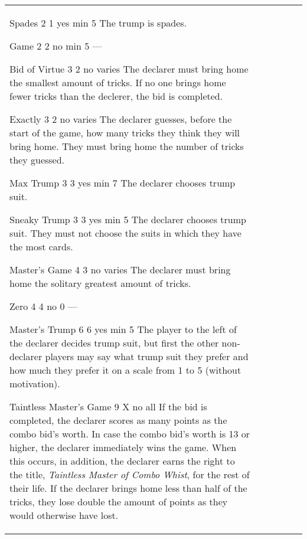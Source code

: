 \begin{table}
\begin{center}
\begin{tabularx}{\textwidth}{
			l
			S[table-number-alignment=center, table-format=1.0]
			S[table-number-alignment=center, table-format=1.0]
			cc|X
		}
				\standardBidItem%
				{Spades}
				{2}
				{1}
				{yes}
				{min 5}
				{%
					The trump is spades.
				}

				\standardBidItem%
				{Game}
				{2}
				{2}
				{no}
				{min 5}
				{%
					---
				}

				\standardBidItem%
				{Bid of Virtue}
				{3}
				{2}
				{no}
				{varies}
				{%
					The declarer must bring home the smallest amount of tricks. If no one brings home fewer tricks than the declerer, the bid is completed.
				}

				\standardBidItem%
				{Exactly}
				{3}
				{2}
				{no}
				{varies}
				{%
					The declarer guesses, before the start of the game, how many tricks they think they will bring home. They must bring home the number of tricks they guessed.
				}

				\standardBidItem%
				{Max Trump}
				{3}
				{3}
				{yes}
				{min 7}
				{%
					The declarer chooses trump suit.
				}

				\standardBidItem%
				{Sneaky Trump}
				{3}
				{3}
				{yes}
				{min 5}
				{%
					The declarer chooses trump suit. They must not choose the suits in which they have the most cards.
				}

				\standardBidItem%
				{Master's Game}
				{4}
				{3}
				{no}
				{varies}
				{%
					The declarer must bring home the solitary greatest amount of tricks.
				}

				\standardBidItem%
				{Zero}
				{4}
				{4}
				{no}
				{0}
				{%
					---
				}

				\standardBidItem%
				{Master's Trump}
				{6}
				{6}
				{yes}
				{min 5}
				{%
					The player to the left of the declarer decides trump suit, but first the other non-declarer players may say what trump suit they prefer and how much they prefer it on a scale from 1 to 5 (without motivation).
				}

				\standardBidItem%
				{Taintless Master's Game}
				{9}
				{X}
				{no}
				{all}
				{%
					If the bid is completed, the declarer scores as many points as the combo bid's worth. In case the combo bid's worth is 13 or higher, the declarer immediately wins the game. When this occurs, in addition, the declarer earns the right to the title, \emph{Taintless Master of Combo Whist}, for the rest of their life. If the declarer brings home less than half of the tricks, they lose double the amount of points as they would otherwise have lost.
				}
		\end{tabularx}
	\end{center}
\end{table}

